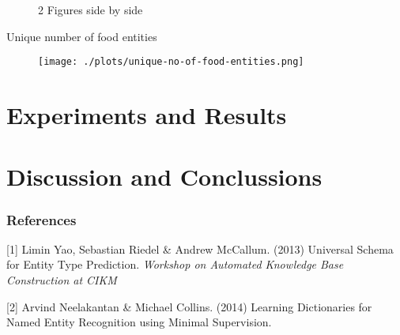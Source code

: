 \documentclass{article} %
\begin{document}
\begin{figure}[h]
    \centering
    \qquad
    \caption{2 Figures side by side}%
    \label{fig:example}%
\end{figure}


Unique number of food entities

\begin{figure}[h]
  \begin{center}
    \texttt{[image: ./plots/unique-no-of-food-entities.png]}
    \label{fig:}
    \caption{}
  \end{center}
\end{figure}




\section{Experiments and Results}
\section{Discussion and Conclussions}

\subsubsection*{References}


\small{
[1] Limin Yao, Sebastian Riedel \& Andrew McCallum. (2013) 
Universal Schema for Entity Type Prediction. 
{\it Workshop on Automated Knowledge Base Construction at CIKM }

[2] Arvind Neelakantan \& Michael Collins. (2014)
Learning Dictionaries for Named Entity Recognition using Minimal Supervision. 
}
\end{document}
